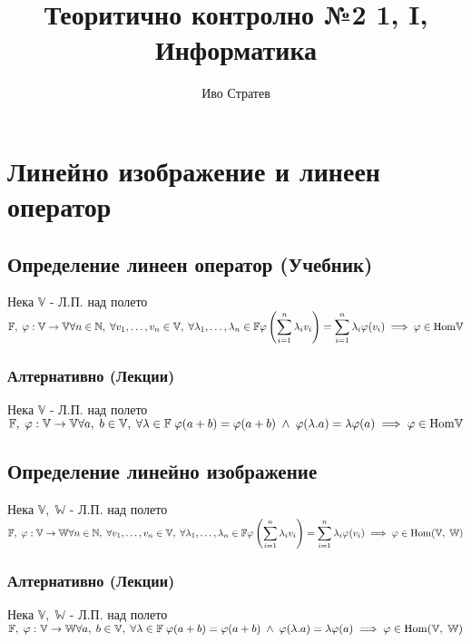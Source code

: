\documentclass{article}
\title{Теоритично контролно №2 1, I, Информатика}
\author{Иво Стратев}
\newcommand{\V}{\mathbb{V}}
\newcommand{\N}{\mathbb{N}}
\newcommand{\F}{\mathbb{F}}
\newcommand{\W}{\mathbb{W}}
\newcommand{\n}[1]{#1_1, \dots, #1_n}
\begin{document}
    \maketitle
    \section{Линейно изображение и линеен оператор}
    \subsection{Определение линеен оператор (Учебник)}
    Нека \(\V\) - Л.П. над полето \(\F, \; \varphi : \V \to \V \\\\
    \forall n \in \N, \; \forall \n{v} \in \V, \; \forall \n{\lambda} \in \F \\\\
    \varphi\left(\displaystyle\sum_{i = 1}^n \lambda_i v_i\right)
    = \displaystyle\sum_{i = 1}^n \lambda_i \varphi(v_i) \implies \varphi \in \mathrm{Hom}\V \)
    \subsubsection{Алтернативно (Лекции)}
    Нека \(\V\) - Л.П. над полето \(\F, \; \varphi : \V \to \V \\\\
    \forall a, \; b \in \V, \; \forall \lambda \in \F \;
    \varphi(a + b) = \varphi(a + b) \; \land \; \varphi(\lambda.a) = \lambda\varphi(a) \\\\
    \implies \varphi \in \mathrm{Hom}\V \)
    \subsection{Определение линейно изображение}
    Нека \(\V, \; \W\) - Л.П. над полето \(\F, \; \varphi : \V \to \W \\\\
    \forall n \in \N, \; \forall \n{v} \in \V, \; \forall \n{\lambda} \in \F \\\\
    \varphi\left(\displaystyle\sum_{i = 1}^n \lambda_i v_i\right)
    = \displaystyle\sum_{i = 1}^n \lambda_i \varphi(v_i) \implies \varphi \in \mathrm{Hom}(\V, \; \W) \)
    \subsubsection{Алтернативно (Лекции)}
    Нека \(\V, \; \W\) - Л.П. над полето \(\F, \; \varphi : \V \to \W \\\\
    \forall a, \; b \in \V, \; \forall \lambda \in \F \;
    \varphi(a + b) = \varphi(a + b) \; \land \; \varphi(\lambda.a) = \lambda\varphi(a) \\\\
    \implies \varphi \in \mathrm{Hom}(\V, \; \W) \)
\end{document}
